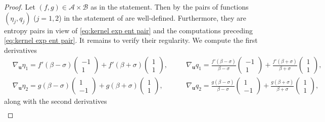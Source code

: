 \documentclass[11pt,a4paper,reqno]{amsart}
\numberwithin{equation}{section}
\theoremstyle{definition}
\theoremstyle{remark}
\newcommand{\bu}{\mathbf{u}}
\begin{document}
{\begin{proof}
Let $(f,g) \in \mathcal{A} \times \mathcal{B}$ as in the statement. Then by  the pairs of functions $(\eta_j,q_j)$ ($j=1,2$) in the statement of  are well-defined. Furthermore, they are entropy pairs in view of \eqref{eq:kernel exp ent pair} and the computations preceding \eqref{eq:kernel exp ent pair}.
%
It remains to verify their regularity. We compute the first derivatives 
\begin{equation*}
   \begin{aligned} &\nabla_\bu \eta_1 = f'(\beta-\sigma) \left( \begin{matrix}-1 \\ 1 \end{matrix} \right) + f'(\beta+\sigma) \left( \begin{matrix}
        1 \\ 1
    \end{matrix} \right) , \quad && \nabla_\bu q_1 = \frac{f'(\beta-\sigma)}{\beta-\sigma} \left( \begin{matrix}-1 \\ 1 \end{matrix} \right) + \frac{f'(\beta+\sigma)}{\beta+\sigma} \left( \begin{matrix}
        1 \\ 1
    \end{matrix} \right), \\ 
    &\nabla_\bu \eta_2 = g(\beta-\sigma) \left( \begin{matrix} 1 \\ -1 \end{matrix} \right) + g(\beta+\sigma) \left( \begin{matrix}
        1 \\ 1
    \end{matrix} \right) , \quad && \nabla_\bu q_2 = \frac{g(\beta-\sigma)}{\beta-\sigma} \left( \begin{matrix} 1 \\ -1 \end{matrix} \right) + \frac{g(\beta+\sigma)}{\beta+\sigma} \left( \begin{matrix}
        1 \\ 1
    \end{matrix} \right), 
    \end{aligned}
\end{equation*}
along with the second derivatives 
\begin{equation*}
   \begin{aligned}

\end{aligned}
\end{equation*}
\end{proof}}
\end{document}
